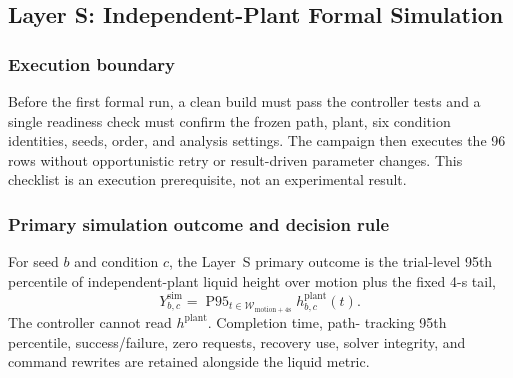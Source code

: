 \subsection{Layer S: Independent-Plant Formal Simulation}

\subsubsection{Execution boundary}

Before the first formal run, a clean build must pass the controller tests and a
single readiness check must confirm the frozen path, plant, six condition
identities, seeds, order, and analysis settings.  The campaign then executes
the 96 rows without opportunistic retry or result-driven parameter changes.
This checklist is an execution prerequisite, not an experimental result.

\subsubsection{Primary simulation outcome and decision rule}

For seed $b$ and condition $c$, the Layer~S primary outcome is the trial-level
95th percentile of independent-plant liquid height over motion plus the fixed
4-s tail,
\begin{equation}
  Y^{\mathrm{sim}}_{b,c}
  =\operatorname{P95}_{t\in\mathcal W_{\mathrm{motion+4s}}}
  h^{\mathrm{plant}}_{b,c}(t).
  \label{eq:primary_sim_outcome}
\end{equation}
The controller cannot read $h^{\mathrm{plant}}$.  Completion time, path-
tracking 95th percentile, success/failure, zero requests, recovery use,
solver integrity, and command rewrites are retained alongside the liquid
metric.

